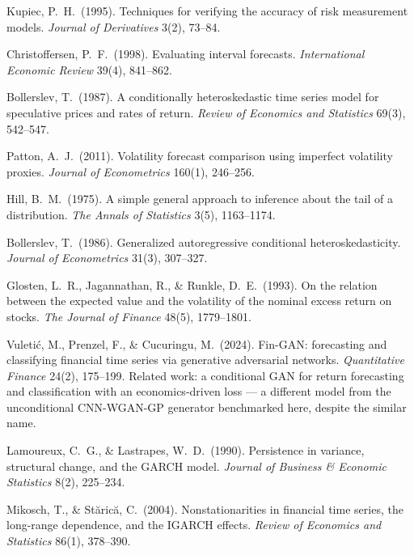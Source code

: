 \documentclass[10pt]{article}
\begin{document}
{\begin{enumerate}[label={\textbf{[\arabic*]}},leftmargin=2.8em,itemsep=4pt,parsep=0pt,topsep=2pt]
\item \hypertarget{R:34}{}%
  Kupiec, P.\ H.\ (1995). Techniques for verifying the accuracy of risk measurement models. \textit{Journal of Derivatives} 3(2), 73--84.

\item \hypertarget{R:35}{}%
  Christoffersen, P.\ F.\ (1998). Evaluating interval forecasts. \textit{International Economic Review} 39(4), 841--862.

\item \hypertarget{R:36}{}%
  Bollerslev, T.\ (1987). A conditionally heteroskedastic time series model for speculative prices and rates of return. \textit{Review of Economics and Statistics} 69(3), 542--547.

\item \hypertarget{R:37}{}%
  Patton, A.\ J.\ (2011). Volatility forecast comparison using imperfect volatility proxies. \textit{Journal of Econometrics} 160(1), 246--256.

\item \hypertarget{R:38}{}%
  Hill, B.\ M.\ (1975). A simple general approach to inference about the tail of a distribution. \textit{The Annals of Statistics} 3(5), 1163--1174.

\item \hypertarget{R:39}{}%
  Bollerslev, T.\ (1986). Generalized autoregressive conditional heteroskedasticity. \textit{Journal of Econometrics} 31(3), 307--327.

\item \hypertarget{R:40}{}%
  Glosten, L.\ R., Jagannathan, R., \& Runkle, D.\ E.\ (1993). On the relation between the expected value and the volatility of the nominal excess return on stocks. \textit{The Journal of Finance} 48(5), 1779--1801.

\item \hypertarget{R:41}{}%
  Vuleti\'{c}, M., Prenzel, F., \& Cucuringu, M.\ (2024). Fin-GAN: forecasting and classifying financial time series via generative adversarial networks. \textit{Quantitative Finance} 24(2), 175--199. Related work: a conditional GAN for return forecasting and classification with an economics-driven loss --- a different model from the unconditional CNN-WGAN-GP generator benchmarked here, despite the similar name.

\item \hypertarget{R:42}{}%
  Lamoureux, C.\ G., \& Lastrapes, W.\ D.\ (1990). Persistence in variance, structural change, and the GARCH model. \textit{Journal of Business \& Economic Statistics} 8(2), 225--234.

\item \hypertarget{R:43}{}%
  Mikosch, T., \& St\u{a}ric\u{a}, C.\ (2004). Nonstationarities in financial time series, the long-range dependence, and the IGARCH effects. \textit{Review of Economics and Statistics} 86(1), 378--390.

\end{enumerate}
}
\end{document}

